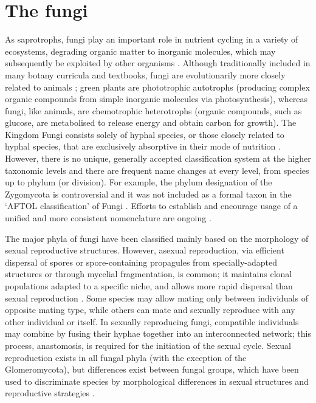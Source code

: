 \section{The fungi}

As saprotrophs, fungi play an important role in nutrient cycling in a variety of ecosystems, degrading organic matter to inorganic molecules, which may subsequently be exploited by other organisms \cite{barea2005}. Although traditionally included in many botany curricula and textbooks, fungi are evolutionarily more closely related to animals \cite{shalchian-tabrizi2008}; green plants are phototrophic autotrophs (producing complex organic compounds from simple inorganic molecules via photosynthesis), whereas fungi, like animals, are chemotrophic heterotrophs (organic compounds, such as glucose, are metabolised to release energy and obtain carbon for growth). The Kingdom Fungi consists solely of hyphal species, or those closely related to hyphal species, that are exclusively absorptive in their mode of nutrition \cite{carlile2001}. However, there is no unique, generally accepted classification system at the higher taxonomic levels and there are frequent name changes at every level, from species up to phylum (or division). For example, the phylum designation of the Zygomycota is controversial and it was not included as a formal taxon in the \lq AFTOL classification' of Fungi \cite{hibbett2007}. Efforts to establish and encourage usage of a unified and more consistent nomenclature are ongoing \cite{celio2006,hibbett2007}.

The major phyla of fungi have been classified mainly based on the morphology of sexual reproductive structures. However, asexual reproduction, via efficient dispersal of spores or spore-containing propagules from specially-adapted structures or through mycelial fragmentation, is common; it maintains clonal populations adapted to a specific niche, and allows more rapid dispersal than sexual reproduction \cite{heitman2006}. Some species may allow mating only between individuals of opposite mating type, while others can mate and sexually reproduce with any other individual or itself. In sexually reproducing fungi, compatible individuals may combine by fusing their hyphae together into an interconnected network; this process, anastomosis, is required for the initiation of the sexual cycle. Sexual reproduction exists in all fungal phyla (with the exception of the Glomeromycota), but differences exist between fungal groups, which have been used to discriminate species by morphological differences in sexual structures and reproductive strategies \cite{guarro1999,taylor2000}.


